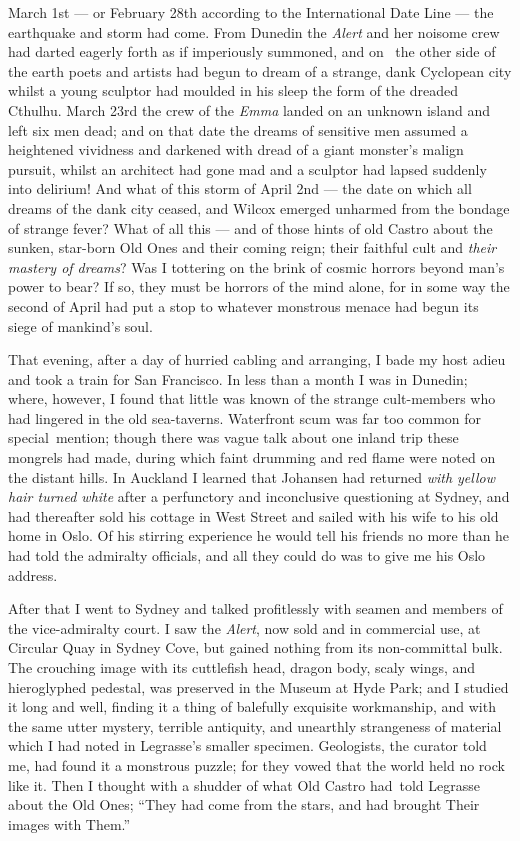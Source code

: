 March 1st --- or February 28th according to the International Date Line ---
the earthquake and storm had come. From Dunedin the \emph{Alert} and her
noisome crew had darted eagerly forth as if imperiously summoned, and on
\est\ the other side of the earth poets and artists had begun to dream of a
strange, dank Cyclopean city whilst a young sculptor had moulded in his
sleep the form of the dreaded Cthulhu. March 23rd the crew of the \emph{Emma}
landed on an unknown island and left six men dead; and on that date the
dreams of sensitive men assumed a heightened vividness and darkened with
dread of a giant monster's malign pursuit, whilst an architect had gone
mad and a sculptor had lapsed suddenly into delirium! And what of this
storm of April 2nd --- the date on which all dreams of the dank city
ceased, and Wilcox emerged unharmed from the bondage of strange fever?
What of all this --- and of those hints of old Castro about the sunken,
star-born Old Ones and their coming reign; their faithful cult and \emph{their
mastery of dreams}? Was I tottering on the brink of cosmic horrors beyond
man's power to bear? If so, they must be horrors of the mind alone, for
in some way the second of April had put a stop to whatever monstrous
menace had begun its siege of mankind's soul.

That evening, after a day of hurried cabling and arranging, I bade my
host adieu and took a train for San Francisco. In less than a month I
was in Dunedin; where, however, I found that little was known of the
strange cult-members who had lingered in the old sea-taverns. Waterfront
scum was far too common for special\est\ mention; though there was vague talk
about one inland trip these mongrels had made, during which faint
drumming and red flame were noted on the distant hills. In Auckland I
learned that Johansen had returned \emph{with yellow hair turned white} after a
perfunctory and inconclusive questioning at Sydney, and had thereafter
sold his cottage in West Street and sailed with his wife to his old home
in Oslo. Of his stirring experience he would tell his friends no more
than he had told the admiralty officials, and all they could do was to
give me his Oslo address.

After that I went to Sydney and talked profitlessly with seamen and
members of the vice-admiralty court. I saw the \emph{Alert}, now sold and in
commercial use, at Circular Quay in Sydney Cove, but gained nothing from
its non-committal bulk. The crouching image with its cuttlefish head,
dragon body, scaly wings, and hieroglyphed pedestal, was preserved in
the Museum at Hyde Park; and I studied it long and well, finding it a
thing of balefully exquisite workmanship, and with the same utter
mystery, terrible antiquity, and unearthly strangeness of material which
I had noted in Legrasse's smaller specimen. Geologists, the curator told
me, had found it a monstrous puzzle; for they vowed that the world held
no rock like it. Then I thought with a shudder of what Old Castro had\est\
 told Legrasse about the Old Ones; ``They had come from the stars, and
had brought Their images with Them.''

